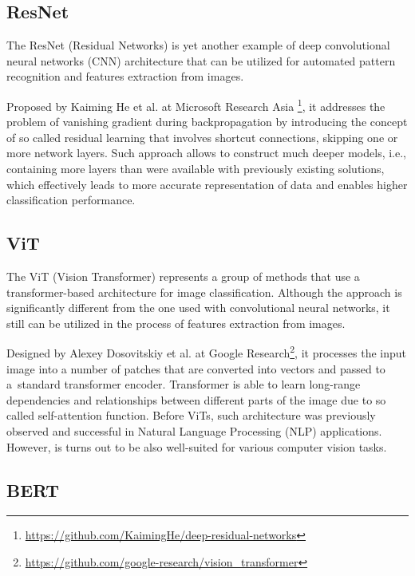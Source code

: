 \subsection{ResNet}
\label{section:ResNet}

The ResNet (Residual Networks) is yet another example of deep convolutional neural networks (CNN) architecture that can be utilized for automated pattern recognition and features extraction from images.

Proposed by Kaiming He et al. \cite{He-2015} at Microsoft Research Asia \footnote{\url{https://github.com/KaimingHe/deep-residual-networks}}, it addresses the problem of vanishing gradient during backpropagation by introducing the concept of so called residual learning that involves shortcut connections, skipping one or more network layers. Such approach allows to construct much deeper models, i.e., containing more layers than were available with previously existing solutions, which effectively leads to more accurate representation of data and enables higher classification performance.


\subsection{ViT}
\label{section:ViT}

The ViT (Vision Transformer) represents a group of methods that use a transformer-based architecture for image classification. Although the approach is significantly different from the one used with convolutional neural networks, it still can be utilized in the process of features extraction from images.

Designed by Alexey Dosovitskiy et al. \cite{Dosovitskiy-2021} at Google Research\footnote{\url{https://github.com/google-research/vision_transformer}}, it processes the input image into a number of patches that are converted into vectors and passed to a~standard transformer encoder. Transformer is able to learn long-range dependencies and relationships between different parts of the image due to so called self-attention function. Before ViTs, such architecture was previously observed and successful in Natural Language Processing (NLP) applications. However, is turns out to be also well-suited for various computer vision tasks.


\subsection{BERT}
\label{section:BERT}

